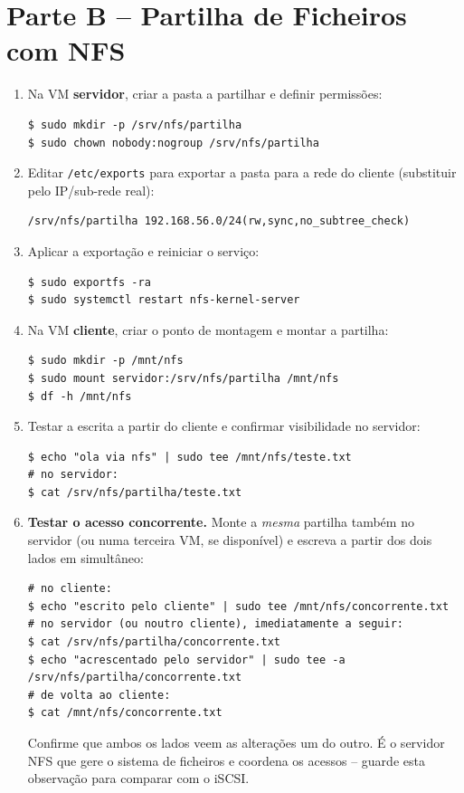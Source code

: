 \documentclass[11pt,a4paper]{article}
\begin{document}
\section{Parte B -- Partilha de Ficheiros com NFS}
\begin{enumerate}[label=\arabic*.]
    \item Na VM \textbf{servidor}, criar a pasta a partilhar e definir permissões:
\begin{lstlisting}
$ sudo mkdir -p /srv/nfs/partilha
$ sudo chown nobody:nogroup /srv/nfs/partilha
\end{lstlisting}

    \item Editar \texttt{/etc/exports} para exportar a pasta para a rede do cliente (substituir pelo IP/sub-rede real):
\begin{lstlisting}
/srv/nfs/partilha 192.168.56.0/24(rw,sync,no_subtree_check)
\end{lstlisting}

    \item Aplicar a exportação e reiniciar o serviço:
\begin{lstlisting}
$ sudo exportfs -ra
$ sudo systemctl restart nfs-kernel-server
\end{lstlisting}

    \item Na VM \textbf{cliente}, criar o ponto de montagem e montar a partilha:
\begin{lstlisting}
$ sudo mkdir -p /mnt/nfs
$ sudo mount servidor:/srv/nfs/partilha /mnt/nfs
$ df -h /mnt/nfs
\end{lstlisting}

    \item Testar a escrita a partir do cliente e confirmar visibilidade no servidor:
\begin{lstlisting}
$ echo "ola via nfs" | sudo tee /mnt/nfs/teste.txt
# no servidor:
$ cat /srv/nfs/partilha/teste.txt
\end{lstlisting}

    \item \textbf{Testar o acesso concorrente.} Monte a \emph{mesma} partilha também no servidor (ou numa terceira VM, se disponível) e escreva a partir dos dois lados em simultâneo:
\begin{lstlisting}
# no cliente:
$ echo "escrito pelo cliente" | sudo tee /mnt/nfs/concorrente.txt
# no servidor (ou noutro cliente), imediatamente a seguir:
$ cat /srv/nfs/partilha/concorrente.txt
$ echo "acrescentado pelo servidor" | sudo tee -a /srv/nfs/partilha/concorrente.txt
# de volta ao cliente:
$ cat /mnt/nfs/concorrente.txt
\end{lstlisting}
    Confirme que ambos os lados veem as alterações um do outro. É o servidor NFS que gere o sistema de ficheiros e coordena os acessos -- guarde esta observação para comparar com o iSCSI.
\end{enumerate}
\end{document}
